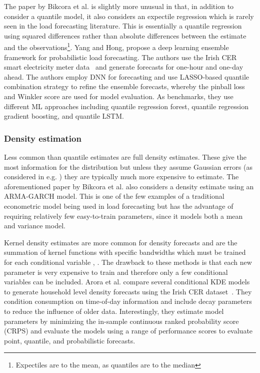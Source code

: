 The paper by Bikcora et al. \cite{bikcora2018dfo} is slightly more unusual in that, in addition to consider a quantile model, it also considers an expectile regression which is rarely seen in the load forecasting literature. This is essentially a quantile regression using squared differences rather than absolute differences between the estimate and the observations\footnote{Expectiles are to the mean, as quantiles are to the median}. Yang and Hong, \cite{Yang2019del} propose a deep learning ensemble framework for probabilistic load forecasting. The authors use the Irish CER smart electricity meter data~\cite{Commission2012csm} and generate forecasts for one-hour and one-day ahead. The authors employ DNN for forecasting and use LASSO-based quantile combination strategy to refine the ensemble forecasts, whereby the pinball loss and Winkler score are used for model evaluation. As benchmarks, they use different ML approaches including quantile regression forest, quantile regression gradient boosting, and quantile LSTM. 

\subsubsection{Density estimation}

Less common than quantile estimates are full density estimates. These give the most information for the distribution but unless they assume Gaussian errors (as considered in e.g. \cite{wang2019pil}) they are typically much more expensive to estimate. The aforementioned paper by Bikcora et al. \cite{bikcora2018dfo} also considers a density estimate using an ARMA-GARCH model. This is one of the few examples of a traditional econometric model being used in load forecasting but has the advantage of requiring relatively few easy-to-train parameters, since it models both a mean and variance model.

Kernel density estimates are more common for density forecasts and are the summation of kernel functions with specific bandwidths which must be trained for each conditional variable \cite{pinto2017mpf}, \cite{Arora2016fes}. The drawback to these methods is that each new parameter is very expensive to train and therefore only a few conditional variables can be included. Arora et al. \cite{Arora2016fes} compare several conditional KDE models to generate household level density forecasts using the Irish CER dataset~\cite{Commission2012csm}. They condition consumption on time-of-day information and include decay parameters to reduce the influence of older data. Interestingly, they estimate model parameters by minimizing the in-sample continuous ranked probability score (CRPS) and evaluate the models using a range of performance scores to evaluate point, quantile, and probabilistic forecasts.

